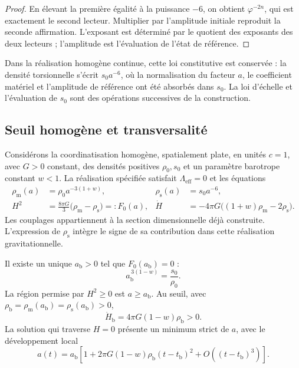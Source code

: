 \begin{proof}
En élevant la première égalité à la puissance \(-6\), on obtient \(\varphi^{-2n}\), qui est exactement le second lecteur. Multiplier par l'amplitude initiale reproduit la seconde affirmation. L'exposant est déterminé par le quotient des exposants des deux lecteurs ; l'amplitude est l'évaluation de l'état de référence.
\end{proof}

Dans la réalisation homogène continue, cette loi constitutive est conservée :
la densité torsionnelle s'écrit \(s_0a^{-6}\), où la normalisation
du facteur \(a\), le coefficient matériel et l'amplitude de référence
ont été absorbés dans \(s_0\). La loi d'échelle et l'évaluation de
\(s_0\) sont des opérations successives de la construction.

\subsection{Seuil homogène et transversalité}
\label{vii:sec:umbral-rebote}

Considérons la coordinatisation homogène, spatialement plate, en unités \(c=1\), avec \(G>0\) constant, des densités positives \(\rho_0,s_0\) et un paramètre barotrope constant \(w<1\). La réalisation spécifiée satisfait \(\Lambda_{\mathrm{eff}}=0\) et les équations
\begin{align}
 \rho_{\mathrm m}(a)&=\rho_0a^{-3(1+w)},&
 \rho_{\mathrm s}(a)&=s_0a^{-6},\\
 H^2&=\frac{8\pi G}{3}
        \bigl(\rho_{\mathrm m}-\rho_{\mathrm s}\bigr)
        =:F_0(a),&
 \dot H&=-4\pi G
        \bigl((1+w)\rho_{\mathrm m}-2\rho_{\mathrm s}\bigr).
 \label{vii:eq:dinamica-homogenea}
\end{align}
Les couplages appartiennent à la section dimensionnelle déjà construite.
L'expression de \(\rho_{\mathrm s}\) intègre le signe de sa contribution
dans cette réalisation gravitationnelle.

\begin{theorem}
\label{vii:thm:rebote}
Il existe un unique \(a_{\mathrm b}>0\) tel que \(F_0(a_{\mathrm b})=0\) :
\[
 a_{\mathrm b}^{\,3(1-w)}=\frac{s_0}{\rho_0}.
\]
La région permise par \(H^2\geq0\) est \(a\geq a_{\mathrm b}\).
Au seuil, avec
\(\rho_{\mathrm b}=\rho_{\mathrm m}(a_{\mathrm b})
                  =\rho_{\mathrm s}(a_{\mathrm b})>0\),
\[
 \dot H_{\mathrm b}=4\pi G(1-w)\rho_{\mathrm b}>0.
\]
La solution qui traverse \(H=0\) présente un minimum strict de \(a\), avec le développement local
\[
 a(t)=a_{\mathrm b}\left[
 1+2\pi G(1-w)\rho_{\mathrm b}(t-t_{\mathrm b})^2
 +O((t-t_{\mathrm b})^3)\right].
\]
\end{theorem}

